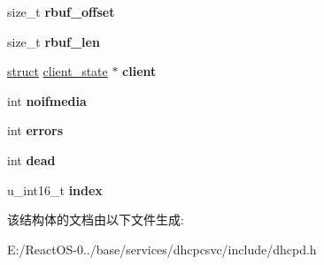 \begin{DoxyCompactItemize}
\mbox{\label{structinterface__info_ac066a6f3709f22977df5ffbc5605e2a3}} 
size\+\_\+t {\bfseries rbuf\+\_\+offset}
\item 
\mbox{\label{structinterface__info_a23e445ee048650b4e902cc88e886593b}} 
size\+\_\+t {\bfseries rbuf\+\_\+len}
\item 
\mbox{\label{structinterface__info_a0e88e963115177d7ae405743a3d66233}} 
\hyperlink{interfacestruct}{struct} \hyperlink{structclient__state}{client\+\_\+state} $\ast$ {\bfseries client}
\item 
\mbox{\label{structinterface__info_ac957ebd16a1b633caf6ee3bcbbc77521}} 
int {\bfseries noifmedia}
\item 
\mbox{\label{structinterface__info_ac5cbc10b1c4d3bb949fc3fa896aa4cfa}} 
int {\bfseries errors}
\item 
\mbox{\label{structinterface__info_a6f3c5d599bc8cf28b3547b8aee741841}} 
int {\bfseries dead}
\item 
\mbox{\label{structinterface__info_a39a81a0e23ff9599d87e3673c451cafe}} 
u\+\_\+int16\+\_\+t {\bfseries index}
\end{DoxyCompactItemize}


该结构体的文档由以下文件生成\+:\begin{DoxyCompactItemize}
\item 
E\+:/\+React\+O\+S-\/0../base/services/dhcpcsvc/include/dhcpd.\+h\end{DoxyCompactItemize}
